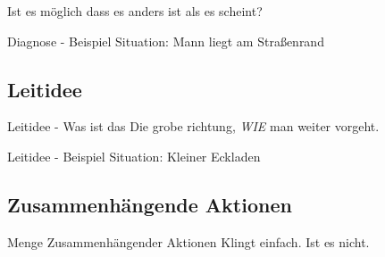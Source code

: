\begin{frame}[standout]
    Ist es möglich dass es anders ist als es scheint?
\end{frame}


%
%

\begin{frame}[c]{Diagnose - Beispiel}
    \Large
    Situation: Mann liegt am Straßenrand
\end{frame}

\subsection{Leitidee}


\begin{frame}[c]{Leitidee - Was ist das}
    \Large
    Die grobe richtung, {\em WIE} man weiter vorgeht.
\end{frame}


\begin{frame}[c]{Leitidee - Beispiel}
    \Large
    Situation: Kleiner Eckladen
\end{frame}


\subsection{Zusammenhängende Aktionen}


\begin{frame}[c]{Menge Zusammenhängender Aktionen}
    \Huge
    Klingt einfach. Ist es nicht.
\end{frame}


